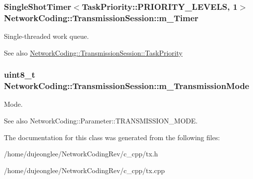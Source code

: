 \subsubsection[{\texorpdfstring{m\+\_\+\+Timer}{m_Timer}}]{\setlength{\rightskip}{0pt plus 5cm}Single\+Shot\+Timer$<$Task\+Priority\+::\+P\+R\+I\+O\+R\+I\+T\+Y\+\_\+\+L\+E\+V\+E\+LS, 1$>$ Network\+Coding\+::\+Transmission\+Session\+::m\+\_\+\+Timer}\hypertarget{class_network_coding_1_1_transmission_session_a73487485091c27671139faa56b28ac2a}{}\label{class_network_coding_1_1_transmission_session_a73487485091c27671139faa56b28ac2a}


Single-\/threaded work queue. 

\begin{DoxySeeAlso}{See also}
\hyperlink{class_network_coding_1_1_transmission_session_aa224de09cc46cfd07df11e4ddeff7472}{Network\+Coding\+::\+Transmission\+Session\+::\+Task\+Priority} 
\end{DoxySeeAlso}
\subsubsection[{\texorpdfstring{m\+\_\+\+Transmission\+Mode}{m_TransmissionMode}}]{\setlength{\rightskip}{0pt plus 5cm}uint8\+\_\+t Network\+Coding\+::\+Transmission\+Session\+::m\+\_\+\+Transmission\+Mode}\hypertarget{class_network_coding_1_1_transmission_session_affd2b90f3eb8788d1a2228a0293ebbcf}{}\label{class_network_coding_1_1_transmission_session_affd2b90f3eb8788d1a2228a0293ebbcf}


Mode. 

\begin{DoxySeeAlso}{See also}
Network\+Coding\+::\+Parameter\+::\+T\+R\+A\+N\+S\+M\+I\+S\+S\+I\+O\+N\+\_\+\+M\+O\+DE. 
\end{DoxySeeAlso}


The documentation for this class was generated from the following files\+:\begin{DoxyCompactItemize}
\item 
/home/dujeonglee/\+Network\+Coding\+Rev/c\+\_\+cpp/tx.\+h\item 
/home/dujeonglee/\+Network\+Coding\+Rev/c\+\_\+cpp/tx.\+cpp\end{DoxyCompactItemize}
